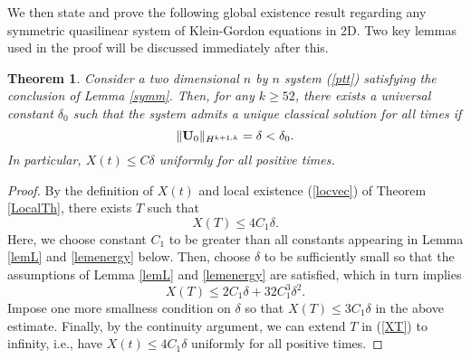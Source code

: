 \documentclass[12pt]{amsart}
\newtheorem{theorem}{Theorem}[section]
\numberwithin{equation}{section} \numberwithin{theorem}{section}
\numberwithin{example}{section} \numberwithin{remark}{section}
\numberwithin{figure}{section} \numberwithin{algorithm}{section}
\def\be{\begin{equation}}
\def\ee{\end{equation}}
\def\vU{{\bf U}}
\def\Hw{H}
\begin{document}
We then state and prove the following global existence result regarding any symmetric quasilinear system of Klein-Gordon equations in 2D. Two key lemmas used in the proof will be discussed immediately after this.
\begin{theorem}\label{KGsystem}Consider a two dimensional $n$ by $n$ system (\ref{ptt}) satisfying the conclusion of Lemma \ref{symm}. Then, for any $k\ge52$, there exists a universal constant $\delta_0$ such that the system admits a unique classical solution for all times if
\begin{equation*}
\|\vU_0\|_{\Hw^{k+1,k}}=\delta<\delta_0.
\end{equation*}
In particular, $X(t)\le C\delta$ uniformly for all positive times.
\end{theorem}
\begin{proof}By the definition of $X(t)$ and local existence (\ref{locvec}) of Theorem \ref{LocalTh}, there exists $T$ such that
\be\label{XT}
  X(T)\leq 4C_1\delta.
 \ee
 Here, we choose constant $C_1$ to be greater than all constants appearing in Lemma \ref{lemL} and \ref{lemenergy} below. Then, choose $\delta$ to be sufficiently small so that the assumptions of Lemma \ref{lemL} and \ref{lemenergy} are satisfied, which in turn implies
\[
X(T)\leq 2C_1\delta+32C_1^3\delta^2.
\]
Impose one more smallness condition on $\delta$ so that $X(T)\le 3C_1\delta$ in the above estimate. Finally, by the continuity argument, we can extend $T$ in (\ref{XT}) to infinity, i.e., have $X(t)\le 4C_1\delta$ uniformly for all positive times. 
\end{proof}
\end{document}
